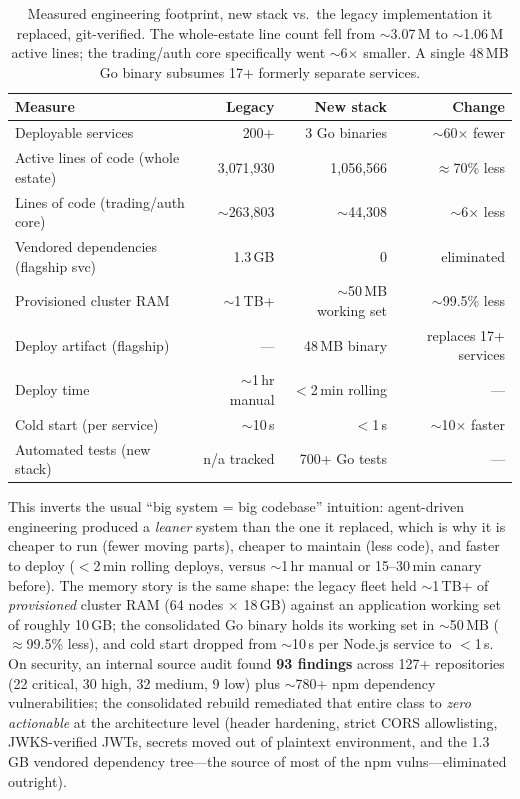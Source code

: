 \documentclass[11pt,letterpaper]{article}
\begin{document}
\begin{table}[h]
\centering
\small
\begin{tabular}{p{} r r r}
\toprule
\textbf{Measure} & \textbf{Legacy} & \textbf{New stack} & \textbf{Change} \\
\midrule
Deployable services & 200+ & 3 Go binaries & $\sim$60$\times$ fewer \\
Active lines of code (whole estate) & 3{,}071{,}930 & 1{,}056{,}566 & $\approx$70\% less \\
Lines of code (trading/auth core) & $\sim$263{,}803 & $\sim$44{,}308 & $\sim$6$\times$ less \\
Vendored dependencies (flagship svc) & 1.3\,GB & 0 & eliminated \\
Provisioned cluster RAM & $\sim$1\,TB+ & $\sim$50\,MB working set & $\sim$99.5\% less \\
Deploy artifact (flagship) & --- & 48\,MB binary & replaces 17+ services \\
Deploy time & $\sim$1\,hr manual & $<$2\,min rolling & --- \\
Cold start (per service) & $\sim$10\,s & $<$1\,s & $\sim$10$\times$ faster \\
Automated tests (new stack) & n/a tracked & 700+ Go tests & --- \\
\bottomrule
\end{tabular}
\caption{Measured engineering footprint, new stack vs.\ the legacy implementation it
replaced, git-verified. The whole-estate line count fell from $\sim$3.07\,M to
$\sim$1.06\,M active lines; the trading/auth core specifically went $\sim$6$\times$
smaller. A single 48\,MB Go binary subsumes 17+ formerly separate services.}
\end{table}

This inverts the usual ``big system = big codebase'' intuition: agent-driven
engineering produced a \emph{leaner} system than the one it replaced, which is why
it is cheaper to run (fewer moving parts), cheaper to maintain (less code), and
faster to deploy ($<$2\,min rolling deploys, versus $\sim$1\,hr manual or 15--30\,min
canary before). The memory story is the same shape: the legacy fleet held
$\sim$1\,TB+ of \emph{provisioned} cluster RAM (64 nodes $\times$ 18\,GB) against an
application working set of roughly 10\,GB; the consolidated Go binary holds its
working set in $\sim$50\,MB ($\approx$99.5\% less), and cold start dropped from
$\sim$10\,s per Node.js service to $<$1\,s. On security, an internal source audit
found \textbf{93 findings} across 127+ repositories (22 critical, 30 high, 32
medium, 9 low) plus $\sim$780+ npm dependency vulnerabilities; the consolidated
rebuild remediated that entire class to \emph{zero actionable} at the architecture
level (header hardening, strict CORS allowlisting, JWKS-verified JWTs, secrets moved
out of plaintext environment, and the 1.3\,GB vendored dependency tree---the source
of most of the npm vulns---eliminated outright).
\end{document}
